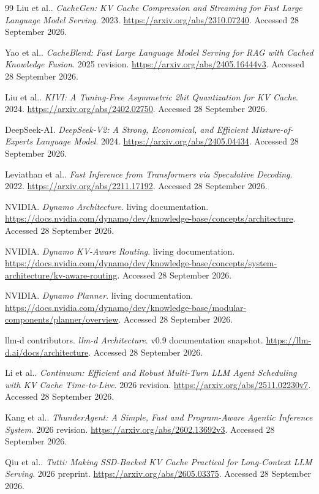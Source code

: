 \begin{thebibliography}{99}
 Liu et al.. \emph{CacheGen: KV Cache Compression and Streaming for Fast Large Language Model Serving}. 2023. \url{https://arxiv.org/abs/2310.07240}. Accessed 28 September 2026.

 Yao et al.. \emph{CacheBlend: Fast Large Language Model Serving for RAG with Cached Knowledge Fusion}. 2025 revision. \url{https://arxiv.org/abs/2405.16444v3}. Accessed 28 September 2026.

 Liu et al.. \emph{KIVI: A Tuning-Free Asymmetric 2bit Quantization for KV Cache}. 2024. \url{https://arxiv.org/abs/2402.02750}. Accessed 28 September 2026.

 DeepSeek-AI. \emph{DeepSeek-V2: A Strong, Economical, and Efficient Mixture-of-Experts Language Model}. 2024. \url{https://arxiv.org/abs/2405.04434}. Accessed 28 September 2026.

 Leviathan et al.. \emph{Fast Inference from Transformers via Speculative Decoding}. 2022. \url{https://arxiv.org/abs/2211.17192}. Accessed 28 September 2026.

 NVIDIA. \emph{Dynamo Architecture}. living documentation. \url{https://docs.nvidia.com/dynamo/dev/knowledge-base/concepts/architecture}. Accessed 28 September 2026.

 NVIDIA. \emph{Dynamo KV-Aware Routing}. living documentation. \url{https://docs.nvidia.com/dynamo/dev/knowledge-base/concepts/system-architecture/kv-aware-routing}. Accessed 28 September 2026.

 NVIDIA. \emph{Dynamo Planner}. living documentation. \url{https://docs.nvidia.com/dynamo/dev/knowledge-base/modular-components/planner/overview}. Accessed 28 September 2026.

 llm-d contributors. \emph{llm-d Architecture}. v0.9 documentation snapshot. \url{https://llm-d.ai/docs/architecture}. Accessed 28 September 2026.

 Li et al.. \emph{Continuum: Efficient and Robust Multi-Turn LLM Agent Scheduling with KV Cache Time-to-Live}. 2026 revision. \url{https://arxiv.org/abs/2511.02230v7}. Accessed 28 September 2026.

 Kang et al.. \emph{ThunderAgent: A Simple, Fast and Program-Aware Agentic Inference System}. 2026 revision. \url{https://arxiv.org/abs/2602.13692v3}. Accessed 28 September 2026.

 Qiu et al.. \emph{Tutti: Making SSD-Backed KV Cache Practical for Long-Context LLM Serving}. 2026 preprint. \url{https://arxiv.org/abs/2605.03375}. Accessed 28 September 2026.


\end{thebibliography}

